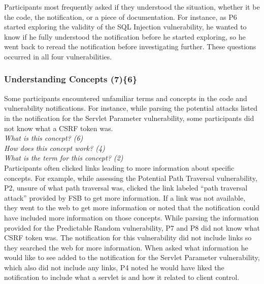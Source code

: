 \documentclass{sig-alternate}
\begin{document}
Participants most frequently asked if they understood the situation, whether it be the code, the notification, or a piece of documentation. 
For instance, as P6 started exploring the validity of the SQL Injection vulnerability, he wanted to know if he fully understood the notification before he started exploring, so he went back to reread the notification before investigating further.
These questions occurred in all four vulnerabilities.



\subsubsection{\textbf{Understanding Concepts (7)\{6\}}}\label{uc}

Some participants encountered unfamiliar terms and concepts in the code and vulnerability notifications.
For instance, while parsing the potential attacks listed in the notification for the Servlet Parameter vulnerability, some participants did not know what a CSRF token was.
\\

\noindent\emph{What is this concept? (6)} \\
\emph{How does this concept work? (4)} \\
\emph{What is the term for this concept? (2)}
\\


Participants often clicked links leading to more information about specific concepts.
For example, while assessing the Potential Path Traversal vulnerability, P2, unsure of what path traversal was, clicked the link labeled ``path traversal attack'' provided by FSB to get more information.
If a link was not available, they went to the web to get more information or noted that the notification could have included more information on those concepts.
While parsing the information provided for the Predictable Random vulnerability, P7 and P8 did not know what CSRF token was.
The notification for this vulnerability did not include links so they searched the web for more information. 
When asked what information he would like to see added to the notification for the Servlet Parameter vulnerability, which also did not include any links, P4 noted he would have liked the notification to include what a servlet is and how it related to client control.
\end{document}
